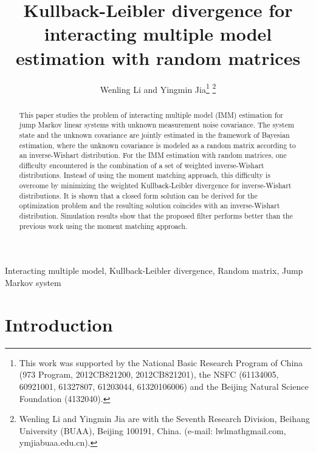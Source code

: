 \documentclass[12pt,draftcls,onecolumn]{IEEEtran}
\begin{document}
\title{Kullback-Leibler divergence for interacting multiple model estimation with random matrices}

\author{Wenling Li and Yingmin Jia\thanks{This work was supported by the National Basic Research Program of
China (973 Program, 2012CB821200, 2012CB821201), the NSFC (61134005,
60921001, 61327807, 61203044, 61320106006) and the Beijing Natural
Science Foundation (4132040).}
\thanks{Wenling Li and Yingmin Jia are with the Seventh Research Division,
Beihang University (BUAA), Beijing 100191, China. (e-mail:
lwlmathgmail.com, ymjiabuaa.edu.cn).} }


\date{}
\maketitle
\begin{abstract}


This paper studies the problem of interacting multiple model (IMM)
estimation for jump Markov linear systems with unknown measurement
noise covariance. The system state and the unknown covariance are
jointly estimated in the framework of Bayesian estimation, where the
unknown covariance is modeled as a random matrix according to an
inverse-Wishart distribution. For the IMM estimation with random
matrices, one difficulty encountered is the combination of a set of
weighted inverse-Wishart distributions. Instead of using the moment
matching approach, this difficulty is overcome by minimizing the
weighted Kullback-Leibler divergence for inverse-Wishart
distributions. It is shown that a closed form solution can be
derived for the optimization problem and the resulting solution
coincides with an inverse-Wishart distribution. Simulation results
show that the proposed filter performs better than the previous work
using the moment matching approach.


\end{abstract}
\begin{keywords}
Interacting multiple model, Kullback-Leibler divergence, Random
matrix, Jump Markov system
\end{keywords}



\section{Introduction}
\end{document}
